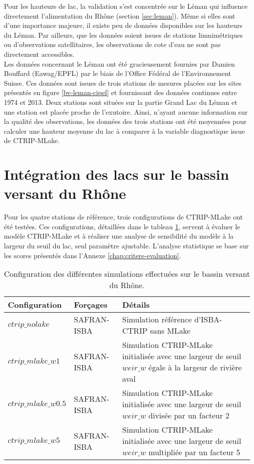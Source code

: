 Pour les hauteurs de lac, la validation s'est concentrée sur le Léman qui influence directement l'alimentation du Rhône (section \ref{sec:leman}). Même si elles sont d'une importance majeure, il existe peu de données disponibles sur les hauteurs du Léman. Par ailleurs, que les données soient issues de stations limnimétriques ou d'observations satellitaires, les observations de cote d'eau ne sont pas directement accessibles.\\
Les données concernant le Léman ont été gracieusement fournies par Damien Bouffard (Eawag/EPFL) par le biais de l'Office Fédéral de l'Environnement Suisse. Ces données sont issues de trois stations de mesures placées sur les sites présentés en figure \ref{bv-leman-cipel} et fournissant des données continues entre 1974 et 2013. Deux stations sont situées sur la partie Grand Lac du Léman et une station est placée proche de l'exutoire. Ainsi, n'ayant aucune information sur la qualité des observations, les données des trois stations ont été moyennées pour calculer une hauteur moyenne du lac à comparer à la variable diagnostique issue de CTRIP-MLake.

\section{{\selectfont Intégration des lacs sur le bassin versant du Rhône}}
Pour les quatre stations de référence, trois configurations de CTRIP-MLake ont été testées. Ces configurations, détaillées dans le tableau \ref{ctrip_config}, servent à évaluer le modèle CTRIP-MLake et à réaliser une analyse de sensibilité du modèle à la largeur du seuil du lac, seul paramètre ajustable. L'analyse statistique se base sur les scores présentés dans l'Annexe \ref{chap:critere-evaluation}.

{\renewcommand{\arraystretch}{1.1}
\begin{table}[h!]
 \caption{Configuration des différentes simulations effectuées sur le bassin versant du Rhône.}
 \label{ctrip_config}
 \begin{tabularx}{\textwidth}{p{3.5cm}p{3.5cm}p{7cm}}
 \hline
 Configuration&Forçages&Détails\\
 \hline
  $ctrip\_nolake$&SAFRAN-ISBA& \footnotesize{Simulation référence d'ISBA-CTRIP sans MLake}\\
  $ctrip\_mlake\_w1$&SAFRAN-ISBA&\footnotesize{Simulation CTRIP-MLake initialisée avec une largeur de seuil $weir\_w$ égale à la largeur de rivière aval}\\
  $ctrip\_mlake\_w0.5$&SAFRAN-ISBA&\footnotesize{Simulation CTRIP-MLake initialisée avec une largeur de seuil $weir\_w$ divisée par un facteur 2}\\
  $ctrip\_mlake\_w5$&SAFRAN-ISBA&\footnotesize{Simulation CTRIP-MLake initialisée avec une largeur de seuil $weir\_w$ multipliée par un facteur 5}\\
  \hline
 \end{tabularx}
\end{table}}


